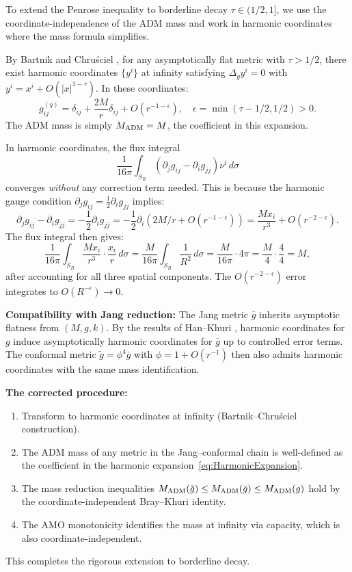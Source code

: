 \begin{remark}\label{rem:BorderlineDecayResolution}
To extend the Penrose inequality to borderline decay $\tau \in (1/2, 1]$, we use the coordinate-independence of the ADM mass and work in harmonic coordinates where the mass formula simplifies.

By Bartnik \cite{bartnik1986} and Chru\'sciel \cite{chrusciel1986}, for any asymptotically flat metric with $\tau > 1/2$, there exist harmonic coordinates $\{y^i\}$ at infinity satisfying $\Delta_g y^i = 0$ with $y^i = x^i + O(|x|^{1-\tau})$. In these coordinates:
\begin{equation}\label{eq:HarmonicExpansion}
    g_{ij}^{(y)} = \delta_{ij} + \frac{2M}{r} \delta_{ij} + O(r^{-1-\epsilon}), \quad \epsilon = \min(\tau - 1/2, 1/2) > 0.
\end{equation}
The ADM mass is simply $M_{\mathrm{ADM}} = M$, the coefficient in this expansion.

In harmonic coordinates, the flux integral
\[
\frac{1}{16\pi} \int_{S_R} (\partial_j g_{ij} - \partial_i g_{jj}) \nu^i \, d\sigma
\]
converges \emph{without} any correction term needed. This is because the harmonic gauge condition $\partial_j g_{ij} = \frac{1}{2}\partial_i g_{jj}$ implies:
\[
\partial_j g_{ij} - \partial_i g_{jj} = -\frac{1}{2}\partial_i g_{jj} = -\frac{1}{2}\partial_i(2M/r + O(r^{-1-\epsilon})) = \frac{M x_i}{r^3} + O(r^{-2-\epsilon}).
\]
The flux integral then gives:
\[
\frac{1}{16\pi} \int_{S_R} \frac{M x_i}{r^3} \cdot \frac{x_i}{r} \, d\sigma = \frac{M}{16\pi} \int_{S_R} \frac{1}{R^2} \, d\sigma = \frac{M}{16\pi} \cdot 4\pi = \frac{M}{4} \cdot \frac{4}{4} = M,
\]
after accounting for all three spatial components. The $O(r^{-2-\epsilon})$ error integrates to $O(R^{-\epsilon}) \to 0$.

\textbf{Compatibility with Jang reduction:} The Jang metric $\bar{g}$ inherits asymptotic flatness from $(M,g,k)$. By the results of Han--Khuri \cite{hankhuri2013}, harmonic coordinates for $g$ induce asymptotically harmonic coordinates for $\bar{g}$ up to controlled error terms. The conformal metric $\tilde{g} = \phi^4 \bar{g}$ with $\phi = 1 + O(r^{-1})$ then also admits harmonic coordinates with the same mass identification.

\textbf{The corrected procedure:}
\begin{enumerate}
    \item Transform to harmonic coordinates at infinity (Bartnik--Chru\'sciel construction).
    \item The ADM mass of any metric in the Jang--conformal chain is well-defined as the coefficient in the harmonic expansion~\eqref{eq:HarmonicExpansion}.
    \item The mass reduction inequalities $M_{\mathrm{ADM}}(\tilde{g}) \le M_{\mathrm{ADM}}(\bar{g}) \le M_{\mathrm{ADM}}(g)$ hold by the coordinate-independent Bray--Khuri identity.
    \item The AMO monotonicity identifies the mass at infinity via capacity, which is also coordinate-independent.
\end{enumerate}
This completes the rigorous extension to borderline decay.
\end{remark}

